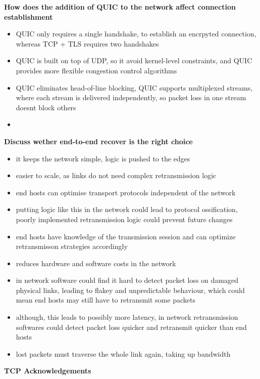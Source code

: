 \documentclass{article}
\begin{document}
\clearpage

\textbf{How does the addition of QUIC to the network affect connection establishment}
\begin{itemize}
    \item QUIC only requires a single handshake, to establish an encrpyted connection, whereas TCP + TLS requires two handshakes
    \item QUIC is built on top of UDP, so it avoid kernel-level constraints, and QUIC provides more flexible congestion control algorithms
    \item QUIC eliminates head-of-line blocking, QUIC supports multiplexed streams, where each stream is delivered independently, so packet loss in one stream doesnt block others
    \item
\end{itemize}

\textbf{Discuss wether end-to-end recover is the right choice}
\begin{itemize}
    \item it keeps the network simple, logic is pushed to the edges
    \item easier to scale, as links do not need complex retransmission logic
    \item end hosts can optimise transport protocols independent of the network
    \item putting logic like this in the network could lead to protocol ossification, poorly implemented retransmission logic could prevent future changes
    \item end hosts have knowledge of the transmission session and can optimize retransmisson strategies accordingly
    \item reduces hardware and software costs in the network
    \item in network software could find it hard to detect packet loss on damaged physical links, leading to flakey and unpredictable behaviour, which could mean end hosts may still have to retransmit some packets
    \item although, this leads to possibly more latency, in network retransmission softwares could detect packet loss quicker and retransmit quicker than end hosts
    \item lost packets must traverse the whole link again, taking up bandwidth
\end{itemize}

\textbf{TCP Acknowledgements}
\end{document}
